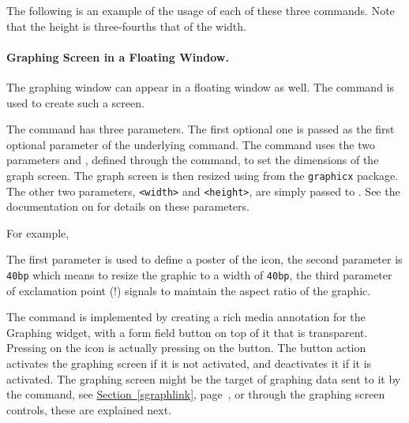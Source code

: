 \documentclass{article}
\begin{document}
The following is an example of the usage of each of these three commands. Note that the
height is three-fourths that of the width.

\begin{dCmd*}{\linewidth}
\graphScreen[poster=aflogo]{\hScreenGraph}{\vScreenGraph}
\end{dCmd*}

\paragraph{Graphing Screen in a Floating Window.} The graphing
window can appear in a floating window as well. The
 command is used to create such a screen.

\begin{dCmd}{.9\linewidth}
\end{dCmd}
\PD The command has three parameters. The first optional one is
passed as the first optional parameter of the underlying
 command. The  command uses the two
parameters  and , defined
through the  command, to set the dimensions of
the graph screen. The graph screen is then resized using
 from the \texttt{graphicx} package. The other two
parameters, \texttt{<width>} and \texttt{<height>}, are simply
passed to . See the documentation on 
for details on these parameters.

For example,
\begin{dCmd*}{.7\linewidth}
\iconFloatGraphScreen[poster=aflogo]{40bp}{!}
\end{dCmd*}
The first parameter is used to define a poster of the icon, the
second parameter is \texttt{40bp} which means to resize the graphic
to a width of \texttt{40bp}, the third parameter of exclamation
point (!) signals  to maintain the aspect ratio of the
graphic.

The  command is implemented by creating a
rich media annotation for the {\AcroFLeX} Graphing widget, with a
form field button on top of it that is transparent. Pressing on the
icon is actually pressing on the button. The button action activates
the graphing screen if it is not activated, and deactivates it if it
is activated. The graphing screen might be the target of graphing
data sent to it by the  command, see
\hyperref[sgraphlink]{Section~\ref*{sgraphlink}},
page~\pageref*{sgraphlink}, or through the graphing screen controls,
these are explained next.
\end{document}
